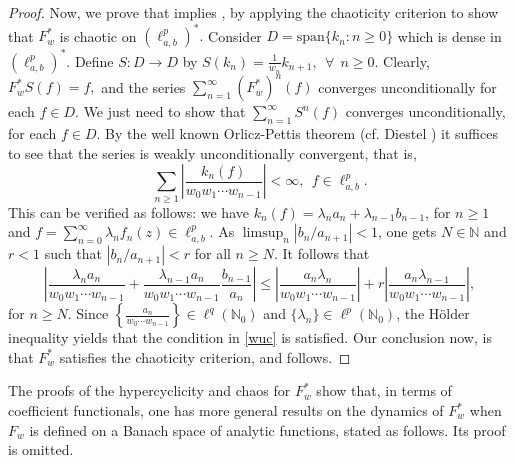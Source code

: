 \documentclass[12pt, reqno]{amsart}
\theoremstyle{definition}
\theoremstyle{remark}
\numberwithin{equation}{section}
\begin{document}
\begin{proof}
        
      Now, we prove that  implies , by applying the chaoticity criterion to show that $F_{w}^{*}$ is chaotic on $(\ell^{p}_{a,b})^{*}.$ Consider $D=\text{span}\{k_{n}:n \geq 0\}$ which is dense in $(\ell^{p}_{a,b})^{*}.$  Define $S:D\rightarrow D$ by $S(k_{n})=\frac{1}{w_{n}}k_{n+1},~~ \forall~~ n\geq 0.$ Clearly, $F_{w}^{*}S(f)=f,$ and the series $\sum_{n=1}^{\infty}(F_{w}^{*})^{n}(f)$ converges unconditionally for each $f \in D.$  We just need to show that $\sum_{n=1}^{\infty}S^{n}(f)$ converges unconditionally, for each $f\in D.$ By the well known Orlicz-Pettis theorem (cf. Diestel \cite{Diestel}) it suffices to see that the series is weakly unconditionally convergent, that is, 
      \begin{equation}\label{wuc}
      \sum_{n\geq 1}\left|\frac{k_n(f)}{w_{0}w_{1}\cdots w_{n-1}}\right|<\infty,~~f\in \ell^p_{a,b}.
      \end{equation}
       This can be verified as follows: we have $k_n(f)=\lambda_n a_n+\lambda_{n-1}b_{n-1}$, for $n\geq 1$ and $f=\sum_{n=0}^{\infty}\lambda_nf_n(z)\in \ell^p_{a,b}$.
As $\limsup_n |b_n/a_{n+1}|<1$, one gets $N\in\mathbb{N}$ and $r<1$ such that $|b_n/a_{n+1}|<r$ for all $n\geq N$. It follows that
\[
\left\lvert \frac{\lambda_na_{n}}{w_{0}w_{1}\cdots w_{n-1}}+\frac{\lambda_{n-1}a_{n}}{w_{0}w_{1}\cdots w_{n-1}}\frac{b_{n-1}}{a_{n}}  \right\rvert\leq \left\lvert\frac{a_{n}\lambda_n}{w_{0}w_{1}\cdots w_{n-1}} \right\rvert+r\left\lvert\frac{a_{n}\lambda_{n-1}}{w_{0}w_{1}\cdots w_{n-1}} \right\rvert,
\]
for $n\geq N$. Since $\left\{\frac {a_n} {w_0\cdots w_{n-1}}\right\}\in \ell^q(\mathbb{N}_{0})$ and $\{\lambda_n\}\in \ell^p(\mathbb{N}_{0})$, the H\"{o}lder inequality yields that the condition in \eqref{wuc} is satisfied. Our conclusion now, is that $F_{w}^{*}$ satisfies the chaoticity criterion, and  follows.
\end{proof}


The proofs of the hypercyclicity and chaos for $F_w^*$ show that, in terms of coefficient functionals, one has more general results on the dynamics of $F_w^*$ when $F_w$ is defined on a Banach space of analytic functions, stated as follows. Its proof is omitted.
\end{document}
